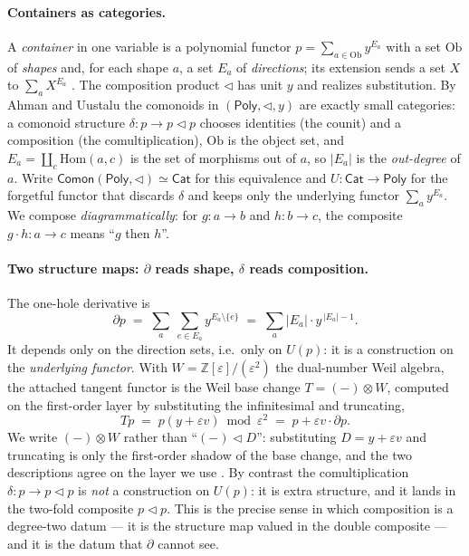 \documentclass[11pt]{article}
\theoremstyle{definition}
\newcommand{\Poly}{\mathsf{Poly}}
\newcommand{\Cat}{\mathsf{Cat}}
\newcommand{\Comon}{\mathsf{Comon}}
\newcommand{\Ob}{\mathrm{Ob}}
\newcommand{\Hom}{\mathrm{Hom}}
\newcommand{\Z}{\mathbb{Z}}
\newcommand{\lto}{\!\lhd\!}
\begin{document}
\paragraph{Containers as categories.}
A \emph{container} in one variable is a polynomial functor $p=\sum_{a\in\Ob}y^{E_a}$ with a set
$\Ob$ of \emph{shapes} and, for each shape $a$, a set $E_a$ of \emph{directions}; its extension
sends a set $X$ to $\sum_a X^{E_a}$ \cite{AAGM2003,GambinoKock2013}. The composition product $\lhd$
has unit $y$ and realizes substitution. By Ahman and Uustalu \cite{AhmanUustalu2016} the comonoids
in $(\Poly,\lhd,y)$ are exactly small categories: a comonoid structure
$\delta\colon p\to p\lto p$ chooses identities (the counit) and a composition (the
comultiplication), $\Ob$ is the object set, and $E_a=\coprod_c\Hom(a,c)$ is the set of morphisms
out of $a$, so $|E_a|$ is the \emph{out-degree} of $a$. Write
$\Comon(\Poly,\lhd)\simeq\Cat$ for this equivalence and $U\colon\Cat\to\Poly$ for the forgetful
functor that discards $\delta$ and keeps only the underlying functor $\sum_a y^{E_a}$. We compose
\emph{diagrammatically}: for $g\colon a\to b$ and $h\colon b\to c$, the composite $g\cdot h\colon
a\to c$ means ``$g$ then $h$''.

\paragraph{Two structure maps: $\partial$ reads shape, $\delta$ reads composition.}
The one-hole derivative \cite{AAGM2003} is
\[
   \partial p \;=\; \sum_a\ \sum_{e\in E_a} y^{E_a\setminus\{e\}}
             \;=\; \sum_a |E_a|\cdot y^{\,|E_a|-1}.
\]
It depends only on the direction sets, i.e.\ only on $U(p)$: it is a construction on the
\emph{underlying functor}. With $W=\Z[\varepsilon]/(\varepsilon^2)$ the dual-number Weil algebra,
the attached tangent functor is the Weil base change $T=(-)\otimes W$, computed on the first-order
layer by substituting the infinitesimal and truncating,
\begin{equation}\label{eq:T}
   Tp \;=\; p(y+\varepsilon v)\bmod\varepsilon^2 \;=\; p+\varepsilon v\cdot\partial p .
\end{equation}
We write $(-)\otimes W$ rather than ``$(-)\lhd D$'': substituting $D=y+\varepsilon v$ and
truncating is only the first-order shadow of the base change, and the two descriptions agree on the
layer we use \cite{MacBethCartan,MacBethParallel}. By contrast the comultiplication
$\delta\colon p\to p\lto p$ is \emph{not} a construction on $U(p)$: it is extra structure, and it
lands in the two-fold composite $p\lto p$. This is the precise sense in which composition is a
degree-two datum --- it is the structure map valued in the double composite --- and it is the datum
that $\partial$ cannot see.
\end{document}
